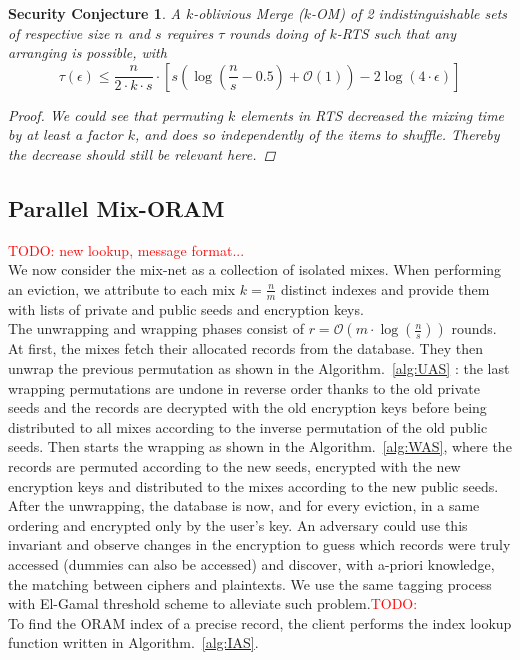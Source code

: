 \documentclass{llncs}
\newtheorem{seccjt}{Security Conjecture}
\newcommand{\todo}[1]{\textcolor{red}{TODO: #1}}
\begin{document}
\begin{seccjt}
A $k$-oblivious Merge ($k$-OM) of 2 indistinguishable sets of respective size $n$ and $s$ requires $\tau$ rounds doing of $k$-RTS such that any arranging is possible, with
$$ \tau(\epsilon) \leq \frac{n}{2\cdot k \cdot s}  \cdot \left [ s \left( \log \left (\frac{n}{s}-0.5\right) +\mathcal{O}\left(1\right) \right ) - 2\log \left( 4 \cdot \epsilon\right) \right ] $$
\begin{proof}
We could see that permuting $k$ elements in RTS decreased the mixing time by at least a factor $k$, and does so independently of the items to shuffle. Thereby the decrease should still be relevant here.
\end{proof}
\end{seccjt}
%
\subsection{Parallel Mix-ORAM}\label{parallelMixORAM}
\todo{new lookup, message format... \\}
%
We now consider the mix-net as a collection of isolated mixes. When performing an eviction, we attribute to each mix  $k=\frac{n}{m}$ distinct indexes and provide them with lists of private and public seeds and encryption keys.\\
The unwrapping and wrapping phases consist of $r=\mathcal{O}\left ( m \cdot \log \left (\frac{n}{s} \right ) \right )$ rounds.
At first, the mixes fetch their allocated records from the database. They then unwrap the previous permutation as shown in the Algorithm.~\ref{alg:UAS} : the last wrapping permutations are undone in reverse order thanks to the old private seeds and the records are decrypted with the old encryption keys before being distributed to all mixes according to the inverse permutation of the old public seeds. Then starts the wrapping as shown in the Algorithm.~\ref{alg:WAS}, where the records are permuted according to the new seeds, encrypted with the new encryption keys and distributed to the mixes according to the new public seeds.\\

After the unwrapping, the database is now, and for every eviction, in a same ordering and encrypted only by the user's key. An adversary could use this invariant and observe changes in the encryption to guess which records were truly accessed (dummies can also be accessed) and discover, with a-priori knowledge, the matching between ciphers and plaintexts. 
We use the same tagging process with El-Gamal threshold scheme to alleviate such problem.\todo{}\\
To find the ORAM index of a precise record, the client performs the index lookup function written in Algorithm.~\ref{alg:IAS}.\\
\end{document}
